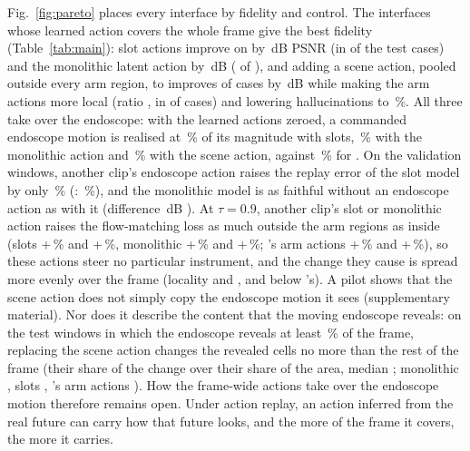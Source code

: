 Fig.~\ref{fig:pareto} places every interface by fidelity and control. The interfaces whose learned action covers the whole frame give the best fidelity (Table~\ref{tab:main}): slot actions improve on \method{} by \,dB PSNR  (in  of the  test cases) and the monolithic latent action by \,dB  ( of ), and adding a scene action, pooled outside every arm region, to \method{} improves  of  cases by \,dB  while making the arm actions more local (ratio  , in  of  cases) and lowering hallucinations to \,\%. All three take over the endoscope: with the learned actions zeroed, a commanded endoscope motion is realised at \,\% of its magnitude with slots, \,\% with the monolithic action and \,\% with the scene action, against \,\% for \method{}. On the validation windows, another clip's endoscope action raises the replay error of the slot model by only \,\% (\method{}: \,\%), and the monolithic model is as faithful without an endoscope action as with it (difference \,dB ). At $\tau=0.9$, another clip's slot or monolithic action raises the flow-matching loss as much outside the arm regions as inside (slots +\,\% and +\,\%, monolithic +\,\% and +\,\%; \method{}'s arm actions +\,\% and +\,\%), so these actions steer no particular instrument, and the change they cause is spread more evenly over the frame (locality  and ,   and   below \method{}'s). A pilot shows that the scene action does not simply copy the endoscope motion it sees (supplementary material). Nor does it describe the content that the moving endoscope reveals: on the  test windows in which the endoscope reveals at least \,\% of the frame, replacing the scene action changes the revealed cells no more than the rest of the frame (their share of the change over their share of the area, median ; monolithic , slots , \method{}'s arm actions ). How the frame-wide actions take over the endoscope motion therefore remains open. Under action replay, an action inferred from the real future can carry how that future looks, and the more of the frame it covers, the more it carries.

